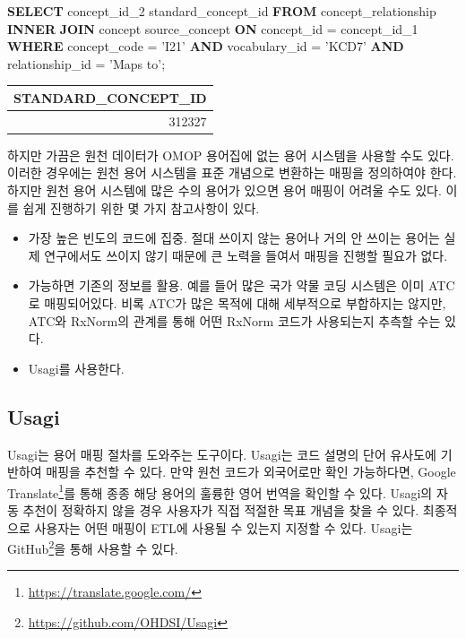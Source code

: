 \documentclass[10.5pt]{book}
\newenvironment{Shaded}{\begin{snugshade}}{\end{snugshade}}
\newcommand{\KeywordTok}[1]{\textcolor[rgb]{0.13,0.29,0.53}{\textbf{#1}}}
\newcommand{\DecValTok}[1]{\textcolor[rgb]{0.00,0.00,0.81}{#1}}
\newcommand{\StringTok}[1]{\textcolor[rgb]{0.31,0.60,0.02}{#1}}
\newcommand{\NormalTok}[1]{#1}
\providecommand{\tightlist}{%
  \setlength{\itemsep}{0pt}\setlength{\parskip}{0pt}}
\let\rmarkdownfootnote\footnote%
\def\footnote{\protect\rmarkdownfootnote}
\theoremstyle{definition}
\theoremstyle{definition}
\theoremstyle{definition}
\theoremstyle{remark}
\begin{document}
\begin{Shaded}
\begin{Highlighting}[]
\KeywordTok{SELECT}\NormalTok{ concept_id_2 standard_concept_id}
\KeywordTok{FROM}\NormalTok{ concept_relationship}
\KeywordTok{INNER} \KeywordTok{JOIN}\NormalTok{ concept source_concept}
  \KeywordTok{ON}\NormalTok{ concept_id = concept_id_}\DecValTok{1}
\KeywordTok{WHERE}\NormalTok{ concept_code = }\StringTok{'I21'}
  \KeywordTok{AND}\NormalTok{ vocabulary_id = }\StringTok{'KCD7'}
  \KeywordTok{AND}\NormalTok{ relationship_id = }\StringTok{'Maps to'}\NormalTok{;}
\end{Highlighting}
\end{Shaded}

\begin{longtable}[]{@{}r@{}}
\toprule
STANDARD\_CONCEPT\_ID\tabularnewline
\midrule
\endhead
312327\tabularnewline
\bottomrule
\end{longtable}

하지만 가끔은 원천 데이터가 OMOP 용어집에 없는 용어 시스템을 사용할 수도
있다. 이러한 경우에는 원천 용어 시스템을 표준 개념으로 변환하는 매핑을
정의하여야 한다. 하지만 원천 용어 시스템에 많은 수의 용어가 있으면 용어
매핑이 어려울 수도 있다. 이를 쉽게 진행하기 위한 몇 가지 참고사항이
있다.

\begin{itemize}
\tightlist
\item
  가장 높은 빈도의 코드에 집중. 절대 쓰이지 않는 용어나 거의 안 쓰이는
  용어는 실제 연구에서도 쓰이지 않기 때문에 큰 노력을 들여서 매핑을
  진행할 필요가 없다.
\item
  가능하면 기존의 정보를 활용. 예를 들어 많은 국가 약물 코딩 시스템은
  이미 ATC로 매핑되어있다. 비록 ATC가 많은 목적에 대해 세부적으로
  부합하지는 않지만, ATC와 RxNorm의 관계를 통해 어떤 RxNorm 코드가
  사용되는지 추측할 수는 있다.
\item
  Usagi를 사용한다.
\end{itemize}

\subsection{Usagi}\label{usagi}

Usagi는 용어 매핑 절차를 도와주는 도구이다. Usagi는 코드 설명의 단어
유사도에 기반하여 매핑을 추천할 수 있다. 만약 원천 코드가 외국어로만
확인 가능하다면, Google Translate\footnote{\url{https://translate.google.com/}}를
통해 종종 해당 용어의 훌륭한 영어 번역을 확인할 수 있다. Usagi의 자동
추천이 정확하지 않을 경우 사용자가 직접 적절한 목표 개념을 찾을 수 있다.
최종적으로 사용자는 어떤 매핑이 ETL에 사용될 수 있는지 지정할 수 있다.
Usagi는 GitHub\footnote{\url{https://github.com/OHDSI/Usagi}}을 통해
사용할 수 있다.  
\end{document}
